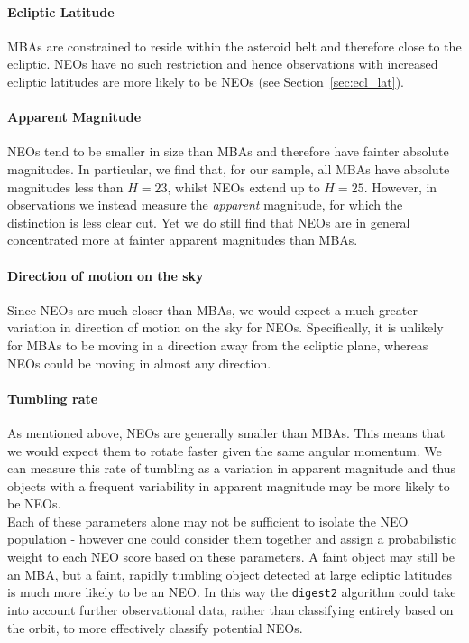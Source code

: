\documentclass[twocolumn]{aastex631}
\newcommand{\dig}{\texttt{digest2}}
\begin{document}
\paragraph{Ecliptic Latitude} MBAs are constrained to reside within the asteroid belt and therefore close to the ecliptic. NEOs have no such restriction and hence observations with increased ecliptic latitudes are more likely to be NEOs (see Section~\ref{sec:ecl_lat}).

\paragraph{Apparent Magnitude} NEOs tend to be smaller in size than MBAs and therefore have fainter absolute magnitudes. In particular, we find that, for our sample, all MBAs have absolute magnitudes less than $H=23$, whilst NEOs extend up to $H=25$. However, in observations we instead measure the \textit{apparent} magnitude, for which the distinction is less clear cut. Yet we do still find that NEOs are in general concentrated more at fainter apparent magnitudes than MBAs.

\paragraph{Direction of motion on the sky} Since NEOs are much closer than MBAs, we would expect a much greater variation in direction of motion on the sky for NEOs. Specifically, it is unlikely for MBAs to be moving in a direction away from the ecliptic plane, whereas NEOs could be moving in almost any direction.

\paragraph{Tumbling rate} As mentioned above, NEOs are generally smaller than MBAs. This means that we would expect them to rotate faster given the same angular momentum. We can measure this rate of tumbling as a variation in apparent magnitude and thus objects with a frequent variability in apparent magnitude may be more likely to be NEOs.\\

Each of these parameters alone may not be sufficient to isolate the NEO population - however one could consider them together and assign a probabilistic weight to each NEO score based on these parameters. A faint object may still be an MBA, but a faint, rapidly tumbling object detected at large ecliptic latitudes is much more likely to be an NEO. In this way the \dig{} algorithm could take into account further observational data, rather than classifying entirely based on the orbit, to more effectively classify potential NEOs.
\end{document}
